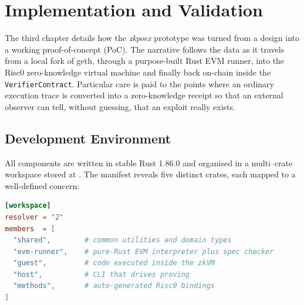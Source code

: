 \chapter{Implementation and Validation}\makeatletter{}\makeatother
\label{chap3}


The third chapter details how the \textit{zkpoex} prototype was turned from a design into a working proof-of-concept (PoC). The narrative follows the data as it travels from a local fork of \textsf{geth}, through a purpose-built Rust EVM runner, into the Risc0 zero-knowledge virtual machine and finally back on-chain inside the \texttt{VerifierContract}.  Particular care is paid to the points where an ordinary execution trace is converted into a zero-knowledge receipt so that an external observer can tell, without guessing, that an exploit really exists.

\section{Development Environment}

All components are written in stable Rust 1.86.0 and organised in a multi–crate
workspace stored at \cite{zkpoex}.  The manifest reveals five distinct crates,
each mapped to a well-defined concern:

\begin{lstlisting}[caption={[Workspace Manifest]},language=toml]
[workspace]
resolver = "2"
members  = [
  "shared",        # common utilities and domain types
  "evm-runner",    # pure-Rust EVM interpreter plus spec checker
  "guest",         # code executed inside the zkVM
  "host",          # CLI that drives proving 
  "methods",       # auto-generated Risc0 bindings
]
\end{lstlisting}


